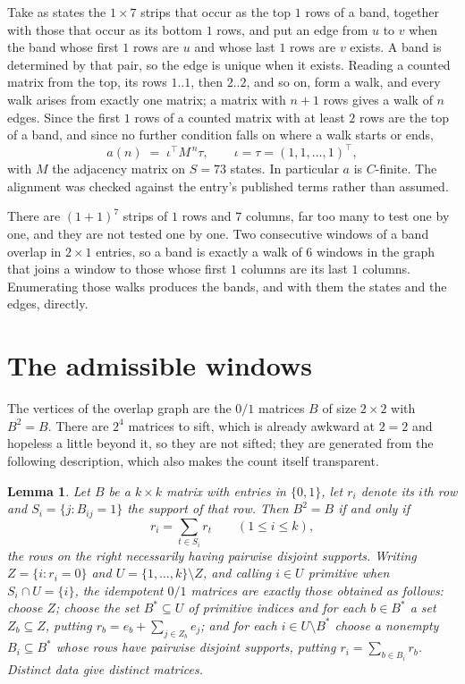 \documentclass[11pt,a4paper]{article}
\theoremstyle{plain}
\newtheorem{lemma}[theorem]{Lemma}
\theoremstyle{definition}
\begin{document}
Take as states the $1\times7$ strips that occur as the top $1$ rows of a band,
together with those that occur as its bottom $1$ rows, and put an edge from $u$ to $v$
when the band whose first $1$ rows are $u$ and whose last $1$ rows are $v$ exists.
A band is determined by that pair, so the edge is unique when it exists. Reading a counted
matrix from the top, its rows $1..1$, then $2..2$, and so on, form a walk, and every
walk arises from exactly one matrix; a matrix with $n+1$ rows gives a walk of $n$ edges.
Since the first $1$ rows of a counted matrix with at least $2$ rows are the top of a
band, and since no further condition falls on where a walk starts or ends,
\[
a(n)\;=\;\iota^{\!\top}M^{\,n}\tau ,\qquad \iota=\tau=(1,1,\dots,1)^{\!\top},
\]
with $M$ the adjacency matrix on $S=73$ states. In particular $a$ is $C$-finite. The
alignment was checked against the entry's published terms rather than assumed.

There are $(1 + 1)^{7}$ strips of $1$ rows and $7$ columns, far too
many to test one by one, and they are not tested one by one. Two consecutive windows of a band
overlap in $2\times1$ entries, so a band is exactly a walk of $6$ windows in
the graph that joins a window to those whose first $1$ columns are its last $1$
columns. Enumerating those walks produces the bands, and with them the states and the edges,
directly.

\section{The admissible windows}

The vertices of the overlap graph are the $0/1$ matrices $B$ of size $2\times2$ with
$B^2=B$. There are $2^{4}$ matrices to sift, which is already awkward at $2=2$ and
hopeless a little beyond it, so they are not sifted; they are generated from the following
description, which also makes the count itself transparent.

\begin{lemma}\label{lem:idem}
Let $B$ be a $k\times k$ matrix with entries in $\{0,1\}$, let $r_i$ denote its $i$th row and
$S_i=\{j:B_{ij}=1\}$ the support of that row. Then $B^2=B$ if and only if
\[
r_i=\sum_{t\in S_i}r_t \qquad (1\le i\le k),
\]
the rows on the right necessarily having pairwise disjoint supports. Writing
$Z=\{i:r_i=0\}$ and $U=\{1,\dots,k\}\setminus Z$, and calling $i\in U$ \emph{primitive}
when $S_i\cap U=\{i\}$, the idempotent $0/1$ matrices are exactly those obtained as follows:
choose $Z$; choose the set $B^{\ast}\subseteq U$ of primitive indices and for each
$b\in B^{\ast}$ a set $Z_b\subseteq Z$, putting $r_b=e_b+\sum_{j\in Z_b}e_j$; and for each
$i\in U\setminus B^{\ast}$ choose a nonempty $B_i\subseteq B^{\ast}$ whose rows have
pairwise disjoint supports, putting $r_i=\sum_{b\in B_i}r_b$. Distinct data give distinct
matrices.
\end{lemma}
\end{document}
